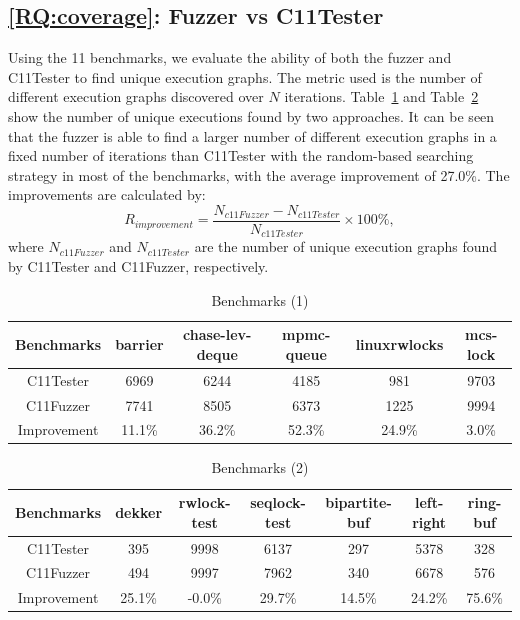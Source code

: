 









\subsection{\ref*{RQ:coverage}: Fuzzer vs C11Tester}

Using the 11 benchmarks, we evaluate the ability of both the fuzzer and C11Tester to find unique execution graphs. The metric used is the number of different execution graphs discovered over $N$ iterations. Table~\ref{c11fuzzer-bench1} and Table~\ref{c11fuzzer-bench2} show the number of unique executions found by two approaches. It can be seen that the fuzzer is able to find a larger number of different execution graphs in a fixed number of iterations than C11Tester with the random-based searching strategy in most of the benchmarks, with the average improvement of 27.0\%. The improvements are calculated by:
\[
	R_{improvement} = \frac{N_{c11Fuzzer} - N_{c11Tester} }{N_{c11Tester} } \times 100 \% ,
\]
where $N_{c11Fuzzer}$ and $N_{c11Tester}$ are the number of unique execution graphs found by C11Tester and C11Fuzzer, respectively.

\begin{table}[h!]
	\begin{tabular}{ |c|ccccc| }
		\hline
		Benchmarks  & barrier & chase-lev-deque & mpmc-queue & linuxrwlocks & mcs-lock \\
		\hline
		C11Tester   & 6969    & 6244            & 4185       & 981          & 9703     \\
		C11Fuzzer   & 7741    & 8505            & 6373       & 1225         & 9994     \\
		\hline
		Improvement & 11.1\%  & 36.2\%          & 52.3\%     & 24.9\%       & 3.0\%    \\
		\hline
	\end{tabular}
	\caption{Benchmarks (1)}
	\label{c11fuzzer-bench1}

\end{table}

\begin{table}[h!]
	\begin{tabular}{ |c|cccccc| }
		\hline
		Benchmarks  & dekker & rwlock-test & seqlock-test & bipartite-buf & left-right & ring-buf \\
		\hline
		C11Tester   & 395    & 9998        & 6137         & 297           & 5378       & 328      \\
		C11Fuzzer   & 494    & 9997        & 7962         & 340           & 6678       & 576      \\
		\hline
		Improvement & 25.1\% & -0.0\%      & 29.7\%       & 14.5\%        & 24.2\%     & 75.6\%   \\
		\hline
	\end{tabular}
	\caption{Benchmarks (2)}
	\label{c11fuzzer-bench2}
\end{table}



